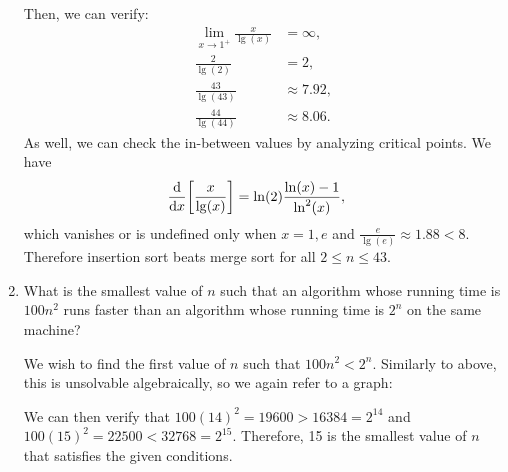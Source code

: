 \documentclass[Chapter01]{subfiles}
\begin{document}
\begin{enumerate}
\begin{answer}
			Then, we can verify:
			\begin{align*}
				\lim_{x \to 1^+} \frac{x}{\lg(x)} &= \infty,\\
				\frac{2}{\lg(2)} &= 2,\\
				\frac{43}{\lg(43)} &\approx 7.92,\\
				\frac{44}{\lg(44)} &\approx 8.06.
			\end{align*}
			As well, we can check the in-between values by analyzing critical points. We have
			\begin{align*}
				\dv{}{x} \qty[\frac{x}{\lg(x)}] &= \ln(2)\frac{\ln(x) - 1}{\ln^2(x)},
			\end{align*}
			which vanishes or is undefined only when $x = 1,e$ and $\frac{e}{\lg(e)} \approx 1.88 < 8$. Therefore insertion sort beats merge sort for all $2 \leq n \leq 43$.
		\end{answer}

		\item What is the smallest value of $n$ such that an algorithm whose running time is $100n^2$ runs faster than an algorithm whose running time is $2^n$ on the same machine?
		\begin{answer}
			We wish to find the first value of $n$ such that $100n^2 < 2^n$. Similarly to above, this is unsolvable algebraically, so we again refer to a graph:\\

			\begin{figure}[h]
				\centering
			\end{figure}

			We can then verify that $100(14)^2 = \num{19600} > \num{16384} = 2^{14}$ and $100(15)^2 = \num{22500} < \num{32768} = 2^{15}$. Therefore, 15 is the smallest value of $n$ that satisfies the given conditions.
		\end{answer}
	\end{enumerate}
\end{document}
